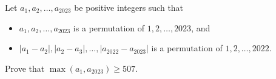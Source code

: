 Let $a_1, a_2, \ldots, a_{2023}$ be positive integers such that
\begin{itemize}
\item $a_1, a_2, \ldots, a_{2023}$ is a permutation of $1, 2, \ldots, 2023$, and
\item $|a_1 - a_2|, |a_2 - a_3|, \ldots, |a_{2022} - a_{2023}|$ is a permutation of $1, 2, \ldots, 2022$.
\end{itemize}
Prove that $\max(a_1, a_{2023}) \geq 507$.
